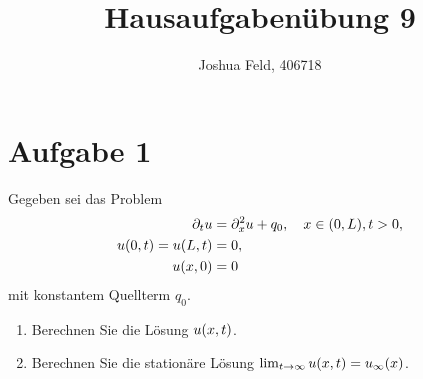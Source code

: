 \documentclass{exercise}
\institute{Applied and Computational Mathematics}
\title{Hausaufgabenübung 9}
\author{Joshua Feld, 406718}
\begin{document}
    \maketitle


    \section*{Aufgabe 1}
    
    \begin{problem}
        Gegeben sei das Problem
        \begin{align*}
            \partial_t u &= \partial_x^2 u + q_0, \quad x \in \parentheses*{0, L}, t > 0,\\
            u\parentheses*{0, t} = u\parentheses*{L, t} &= 0,\\
            u\parentheses*{x, 0} &= 0
        \end{align*}
        mit konstantem Quellterm \(q_0\).
        \begin{enumerate}
            \item Berechnen Sie die Lösung \(u\parentheses*{x, t}\).
            \item Berechnen Sie die stationäre Lösung \(\lim_{t \to \infty}u\parentheses*{x, t} = u_\infty\parentheses*{x}\).
        \end{enumerate}
    \end{problem}
    
\end{document}
